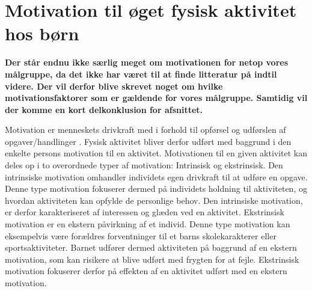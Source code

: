 \section{Motivation til øget fysisk aktivitet hos børn} \label{motivation_boern}
 {\color{red} \textbf{Der står endnu ikke særlig meget om motivationen for netop vores målgruppe, da det ikke har været til at finde litteratur på indtil videre. Der vil derfor blive skrevet noget om hvilke motivationsfaktorer som er gældende for vores målgruppe. Samtidig vil der komme en kort delkonklusion for afsnittet.}}


Motivation er menneskets drivkraft med i forhold til opførsel og udførslen af opgaver/handlinger \citep{V.Brown2007}. Fysisk aktivitet bliver derfor udført med baggrund i den enkelte persons motivation til en aktivitet. Motivationen til en given aktivitet kan deles op i to overordnede typer af motivation: Intrinsisk og ekstrinsisk. \newline
Den intrinsiske motivation omhandler individets egen drivkraft til at udføre en opgave. Denne type motivation fokuserer dermed på individets holdning til aktiviteten, og hvordan aktiviteten kan opfylde de personlige behov. Den intrinsiske motivation, er derfor karakteriseret af interessen og glæden ved en aktivitet. \newline
Ekstrinsisk motivation er en ekstern påvirkning af et individ. Denne type motivation kan eksempelvis være forældres forventninger til et barns skolekarakterer eller sportsaktiviteter. Barnet udfører dermed aktiviteten på baggrund af en ekstern motivation, som kan risikere at blive udført med frygten for at fejle. Ekstrinsisk motivation fokuserer derfor på effekten af en aktivitet udført med en ekstern motivation. \citep{J.SebireJagoR.FoxEtAl2013} 

